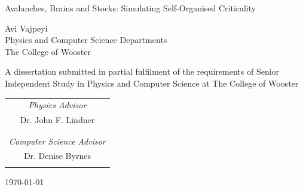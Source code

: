 \documentclass{book}
\begin{document}
\frontmatter

\begin{titlepage}
	\begin{center}

		\huge{Avalanches, Brains and Stocks: Simulating Self-Organised Criticality}

		\vspace{2.5cm}

		\LARGE{Avi Vajpeyi}\\ 
		\LARGE{Physics and Computer Science Departments}\\
		\LARGE{The College of Wooster}\\
		
		\vspace{0.5cm}
		
		\large A dissertation submitted in partial fulfilment 
		of the requirements of  Senior Independent Study in Physics and Computer Science at The College of Wooster\\
		
		\vspace{2.5cm}
		
		\begin{table}[h!]
			\begin{center}
				\begin{tabular}{c}
				
					\large{\emph{Physics Advisor}}\\
					\large{Dr. John F. Lindner}\\
					\vspace{0.5cm}\\
					\hline
					
					\vspace{1.0cm}\\
					\large{\emph{Computer Science Advisor}}\\
					\large{Dr. Denise Byrnes}\\
					\vspace{0.5cm}\\
					\hline
					
				\end{tabular}
			\end{center}
		\end{table}
		
		\vspace{2.5cm}

		\large{\today}

	\end{center}
\end{titlepage}
\end{document}
